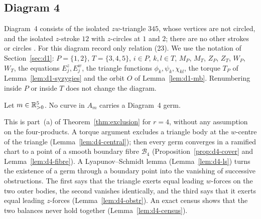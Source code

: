 \subsection{Diagram 4}\label{sec:d4}

Diagram~4 consists of the isolated $zw$-triangle $345$, whose vertices are not circled, and the
isolated $z$-stroke $12$ with $z$-circles at $1$ and $2$; there are no other strokes or circles
\cite[\S7.4, p.~567, and Fig.~11]{AK}.
For this diagram \cite[\S8.4]{AK} record only relation (23).  We use the notation of
Section~\ref{sec:d1}: $P=\{1,2\}$, $T=\{3,4,5\}$, $i\in P$, $k,l\in T$, $M_P$, $M_T$, $Z_P$, $Z_T$,
$W_P$, $W_T$, the equations $E^z_j,E^w_j$, the triangle functions $\phi_k,\psi_k,\chi_{kl}$, the
torque $T_P$ of Lemma~\ref{lem:d1-syzygies} and the orbit $O$ of Lemma~\ref{lem:d1-mb}.
Renumbering inside $P$ or inside $T$ does not change the diagram.

\begin{theorem}\label{thm:d4}
Let $m\in\mathbb{R}_{>0}^5$.  No curve in $A_m$ carries a Diagram~4 germ.
\end{theorem}

This is part~(a) of Theorem~\ref{thm:exclusion} for $r=4$, without any assumption on the
four-products.  A torque argument excludes a triangle body at the $w$-centre of the triangle
(Lemma~\ref{lem:d4-central}); then every germ converges in a ramified chart to a point of a
smooth boundary fibre $\mathcal B_4$ (Proposition~\ref{prop:d4-cover} and
Lemma~\ref{lem:d4-fibre}).  A Lyapunov--Schmidt lemma (Lemma~\ref{lem:d4-ls}) turns the
existence of a germ through a boundary point into the vanishing of successive obstructions.
The first says that the triangle exerts equal leading $w$-forces on the two outer bodies, the
second vanishes identically, and the third says that it exerts equal leading $z$-forces
(Lemma~\ref{lem:d4-obstr}).  An exact census shows that the two balances never hold together
(Lemma~\ref{lem:d4-census}).

